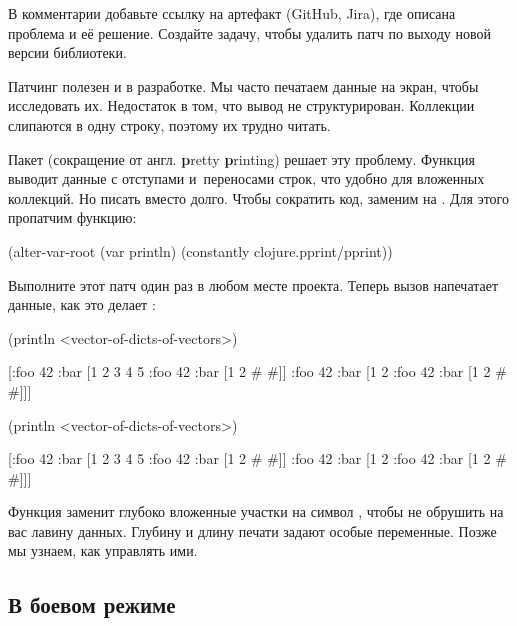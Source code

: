 \fi

В комментарии добавьте ссылку на артефакт (GitHub, Jira), где описана проблема и
её решение. Создайте задачу, чтобы удалить патч по выходу новой версии
библиотеки.

Патчинг полезен и в разработке. Мы часто печатаем данные на экран, чтобы
исследовать их. Недостаток  в том, что вывод не
структурирован. Коллекции слипаются в одну строку, поэтому их трудно читать.


Пакет  (сокращение от англ. \textbf{p}retty \textbf{p}rinting)
решает эту проблему. Функция  выводит данные с отступами и~переносами строк,
что удобно для вложенных коллекций. Но писать 
вместо  долго. Чтобы сократить код, заменим 
на . Для этого пропатчим функцию:

\begin{clojure}
(alter-var-root
 (var println)
 (constantly clojure.pprint/pprint))
\end{clojure}

Выполните этот патч один раз в любом месте проекта. Теперь вызов
 напечатает данные, как это делает :

\ifnarrow

\begin{clojure}
(println <vector-of-dicts-of-vectors>)

[{:foo 42
  :bar [1 2 3 4 5 {:foo 42
                   :bar [1 2 {# #}]}]}
 {:foo 42
  :bar [1 2 {:foo 42
             :bar [1 2 {# #}]}]}]
\end{clojure}

\else

\begin{clojure}
(println <vector-of-dicts-of-vectors>)

[{:foo 42
  :bar [1 2 3 4 5 {:foo 42
                   :bar [1 2 {# #}]}]}
 {:foo 42
  :bar [1 2 {:foo 42
             :bar [1 2 {# #}]}]}]
\end{clojure}

\fi

Функция заменит глубоко вложенные участки на символ \code{#}, чтобы не обрушить
на вас лавину данных. Глубину и длину печати задают особые переменные. Позже мы
узнаем, как управлять ими.

\subsection{В боевом режиме}

